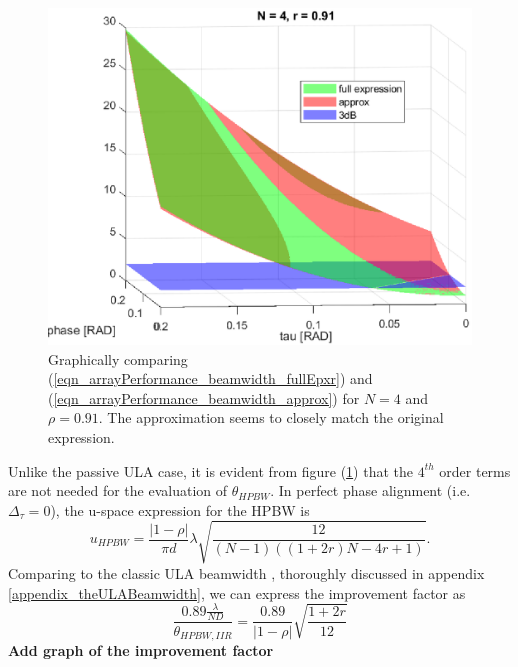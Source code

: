    \begin{figure}
        \label{fig_singleFreqFeedback_2ndTaylorNumericalValidation}
        \centering
        \includegraphics[width=0.9\linewidth]{./Media/spatial_IIR_MATLAB/beamwidth/BW_approx_validation.eps}
        \caption{Graphically comparing (\ref{eqn_arrayPerformance_beamwidth_fullEpxr}) and (\ref{eqn_arrayPerformance_beamwidth_approx}) for $N=4$ and $\rho=0.91$. The approximation seems to closely match the original expression.}
    \end{figure}
    Unlike the passive ULA case, it is evident from figure (\ref{fig_singleFreqFeedback_2ndTaylorNumericalValidation}) that the $4^{th}$ order terms are not needed for the evaluation of $\theta_{HPBW}$. In perfect phase alignment (i.e. $\Delta_{\tau}=0$), the u-space expression for the HPBW is $$u_{HPBW} =
    \frac{
    \left|1-\rho\right|
    }{
    \pi{d}
    }
    \lambda
    \sqrt{\frac{
    12
    }{
    \left(N-1\right)\left(\left(1+2r\right)N-4r+1\right)
    }}.
    $$
    Comparing to the classic ULA beamwidth \cite{VanTrees2002DetectionIV}, thoroughly discussed in appendix \ref{appendix_theULABeamwidth}, we can express the improvement factor as
    $$
    \frac{
    0.89\frac{\lambda}{ND}
    }{
    \theta_{HPBW,IIR}
    }
    =
    \frac{0.89}{\left|1-\rho\right|}\sqrt{\frac{1+2r}{12}}
    $$
    \textbf{Add graph of the improvement factor}
\fi
